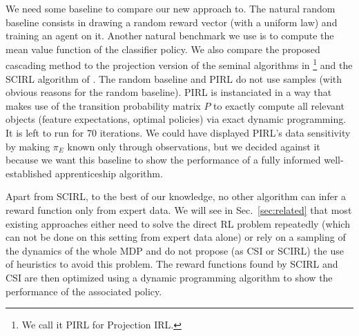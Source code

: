 \documentclass[smallextended]{svjour3}
\begin{document}
We need some baseline to compare our new approach to. The natural random baseline consists in drawing a random reward vector (with a uniform law) and training an agent on it. Another natural benchmark we use is to compute the mean value function of the classifier policy. We also compare the proposed cascading method to the projection version of the seminal algorithms in \cite{abbeel2004apprenticeship}\footnote{We call it PIRL for Projection IRL.} and the SCIRL algorithm of \cite{klein2012scirl}. The random baseline and PIRL do not use samples (with obvious reasons for the random baseline). PIRL is instanciated in a way that makes use of the transition probability matrix $P$ to exactly compute all relevant objects (feature expectations, optimal policies) via exact dynamic programming. It is left to run for 70 iterations. We could have displayed PIRL's data sensitivity by making $\pi_E$ known only through observations, but we decided against it because we want this baseline to show the performance of a fully informed well-established apprenticeship algorithm.

Apart from SCIRL, to the best of our knowledge, no other algorithm can infer a reward function only from expert data. We will see in Sec.~\ref{sec:related} that most existing approaches either need to solve the direct RL problem repeatedly (which can not be done on this setting from expert data alone) or rely on a sampling of the dynamics of the whole MDP and do not propose (as CSI or SCIRL) the use of heuristics to avoid this problem. The reward functions found by SCIRL and CSI are then optimized using a dynamic programming algorithm to show the performance of the associated policy.
\end{document}
